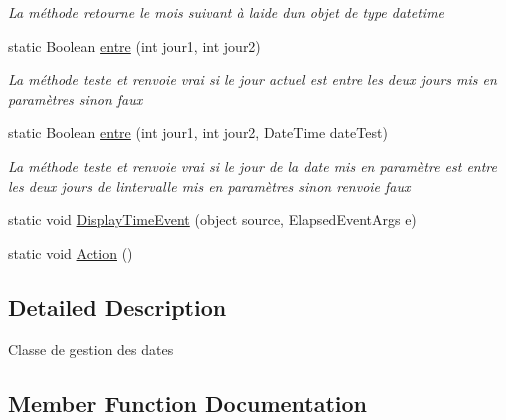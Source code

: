 \begin{DoxyCompactItemize}
\begin{DoxyCompactList}\small\item\em La méthode retourne le mois suivant à l\textquotesingle{}aide d\textquotesingle{}un objet de type datetime \end{DoxyCompactList}\item 
static Boolean \mbox{\hyperlink{classgestion_cloture_1_1gestion_date_a9ee14a2e60b68ffedad925b42a0ad090}{entre}} (int jour1, int jour2)
\begin{DoxyCompactList}\small\item\em La méthode teste et renvoie vrai si le jour actuel est entre les deux jours mis en paramètres sinon faux ~\newline
\end{DoxyCompactList}\item 
static Boolean \mbox{\hyperlink{classgestion_cloture_1_1gestion_date_a8c1ca7bb5e1827fd1a120d6933f83d49}{entre}} (int jour1, int jour2, Date\+Time date\+Test)
\begin{DoxyCompactList}\small\item\em La méthode teste et renvoie vrai si le jour de la date mis en paramètre est entre les deux jours de l\textquotesingle{}intervalle mis en paramètres sinon renvoie faux ~\newline
\end{DoxyCompactList}\item 
static void \mbox{\hyperlink{classgestion_cloture_1_1gestion_date_a6646013d65b640490269556de333607c}{Display\+Time\+Event}} (object source, Elapsed\+Event\+Args e)
\item 
static void \mbox{\hyperlink{classgestion_cloture_1_1gestion_date_a6fd73af56600e9fb9940729449e8af4f}{Action}} ()
\end{DoxyCompactItemize}


\subsection{Detailed Description}
Classe de gestion des dates 



\subsection{Member Function Documentation}
\mbox{\label{classgestion_cloture_1_1gestion_date_a6fd73af56600e9fb9940729449e8af4f}} 
